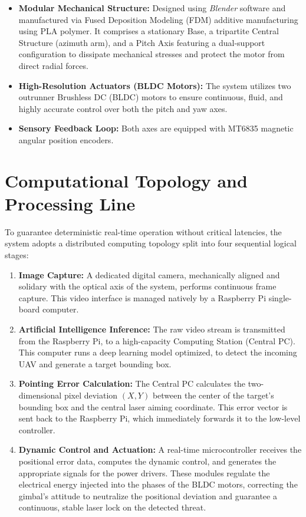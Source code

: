 \documentclass[11pt,a4paper]{article}
\begin{document}
\begin{itemize}[label=\textcolor{NavalBlue}{\small$\bullet$}, leftmargin=0.5cm] %
    \item \textbf{Modular Mechanical Structure:} Designed using \emph{Blender} software and manufactured via Fused Deposition Modeling (FDM) additive manufacturing using PLA polymer. It comprises a stationary Base, a tripartite Central Structure (azimuth arm), and a Pitch Axis featuring a dual-support configuration to dissipate mechanical stresses and protect the motor from direct radial forces.
    \item \textbf{High-Resolution Actuators (BLDC Motors):} The system utilizes two outrunner Brushless DC (BLDC) motors to ensure continuous, fluid, and highly accurate control over both the pitch and yaw axes.
    \item \textbf{Sensory Feedback Loop:} Both axes are equipped with MT6835 magnetic angular position encoders.
\end{itemize}

\section{Computational Topology and Processing Line}
To guarantee deterministic real-time operation without critical latencies, the system adopts a distributed computing topology split into four sequential logical stages:

\begin{enumerate}[leftmargin=0.5cm]
    \item \textbf{Image Capture:} A dedicated digital camera, mechanically aligned and solidary with the optical axis of the system, performs continuous frame capture. This video interface is managed natively by a Raspberry Pi single-board computer.
    \item \textbf{Artificial Intelligence Inference:} The raw video stream is transmitted from the Raspberry Pi, to a high-capacity Computing Station (Central PC). This computer runs a deep learning model optimized, to detect the incoming UAV and generate a target bounding box.
    \item \textbf{Pointing Error Calculation:} The Central PC calculates the two-dimensional pixel deviation $(X, Y)$ between the center of the target's bounding box and the central laser aiming coordinate. This error vector is sent back to the Raspberry Pi, which immediately forwards it to the low-level controller.
    \item \textbf{Dynamic Control and Actuation:} A real-time microcontroller receives the positional error data, computes the dynamic control, and generates the appropriate signals for the power drivers. These modules regulate the electrical energy injected into the phases of the BLDC motors, correcting the gimbal's attitude to neutralize the positional deviation and guarantee a continuous, stable laser lock on the detected threat.
\end{enumerate}
\end{document}
